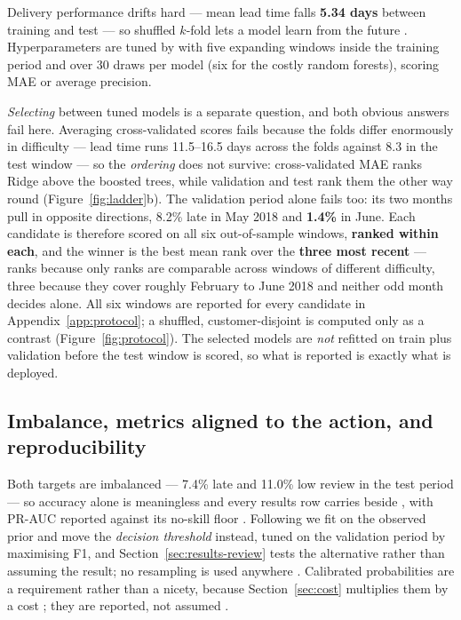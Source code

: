 Delivery performance drifts hard --- mean lead time falls \textbf{5.34 days}
between training and test --- so shuffled $k$-fold lets a model learn from the
future \citep{bergmeir2012cv}. Hyperparameters are tuned by 
with five expanding windows inside the training period and
 \citep{bergstra2012random} over 30 draws per model (six
for the costly random forests), scoring MAE or average precision.

\emph{Selecting} between tuned models is a separate question, and both obvious
answers fail here. Averaging cross-validated scores fails because the folds differ
enormously in difficulty --- lead time runs 11.5--16.5 days across the folds
against 8.3 in the test window --- so the \emph{ordering} does not survive:
cross-validated MAE ranks Ridge above the boosted trees, while validation and test
rank them the other way round (Figure~\ref{fig:ladder}b). The validation period
alone fails too: its two months pull in opposite directions, 8.2\% late in May
2018 and \textbf{1.4\%} in June. Each candidate is therefore scored on all six
out-of-sample windows, \textbf{ranked within each}, and the winner is the best
mean rank over the \textbf{three most recent} --- ranks because only ranks are
comparable across windows of different difficulty, three because they cover
roughly February to June 2018 and neither odd month decides alone. All six windows
are reported for every candidate in Appendix~\ref{app:protocol}; a shuffled,
customer-disjoint  is computed only as a contrast
(Figure~\ref{fig:protocol}). The
selected models are \emph{not} refitted on train plus validation before the test
window is scored, so what is reported is exactly what is deployed.

\subsection{Imbalance, metrics aligned to the action, and reproducibility}
\label{sec:imbalance}

Both targets are imbalanced --- 7.4\% late and 11.0\% low review in the test
period --- so accuracy alone is meaningless and every results row carries
 beside , with PR-AUC reported against
its no-skill floor \citep{saito2015prplot}. Following
\citet{goorbergh2022imbalance} we fit on the observed prior and move the
\emph{decision threshold} instead, tuned on the validation period by maximising
F1, and Section~\ref{sec:results-review} tests the alternative rather than
assuming the result; no resampling is used anywhere \citep{chawla2002smote}.
Calibrated probabilities are a requirement rather than a nicety, because
Section~\ref{sec:cost} multiplies them by a cost \citep{elkan2001cost}; they are
reported, not assumed \citep{niculescu2005calibration}.

